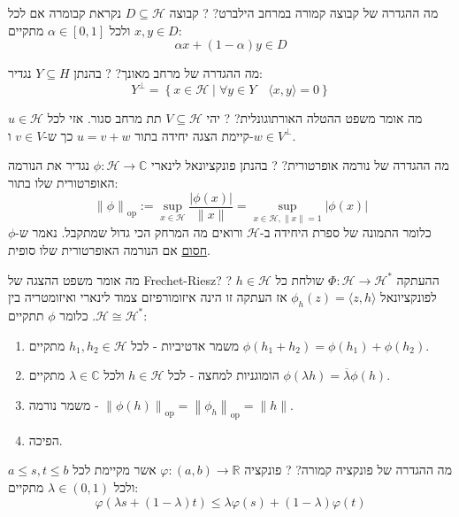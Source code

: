 \documentclass{tstextbook}
\begin{document}
מה ההגדרה של קבוצה קמורה במרחב הילברט?
?
קבוצה \(D \subseteq \mathcal{H}\) נקראת קבומרה אם לכל \(x,y \in D\) ולכל \(\alpha \in[0,1]\) מתקיים:
$$\alpha x+\left( 1-\alpha \right)y \in D$$

מה ההגדרה של מרחב מאונך?
?
בהנתן \(Y\subseteq H\) נגדיר:
$$Y^{\perp}= \left\{  x \in \mathcal{H} \mid \forall y \in Y\quad \langle x,y \rangle =0 \right\}$$

מה אומר משפט ההטלה האורתוגונלית?
?
יהי \(V\subseteq \mathcal{H}\) תת מרחב סגור. אזי לכל \(u\in \mathcal{H}\) קיימת הצגה יחידה בתור \(u=v+w\)  כך ש-\(v \in V\) ו-\(w \in V^{\perp}\).

מה ההגדרה של נורמה אופרטורית?
?
בהנתן פונקציונאל לינארי \(\phi:\mathcal{H}\to \mathbb{C}\) נגדיר את הנורמה האופרטורית שלו בתור:
$$\left\lVert  \phi  \right\rVert _{\mathrm{op}} := \sup _{x \in \mathcal{H}} \frac{\left\lvert  \phi(x)  \right\rvert }{\lVert x \rVert }=\sup _{x \in \mathcal{H}, \lVert x \rVert =1} \left\lvert  \phi(x)  \right\rvert $$
כלומר התמונה של ספרת היחידה ב-\(\mathcal{H}\) ורואים מה המרחק הכי גדול שמתקבל. נאמר ש-\(\phi\)\underline{חסום} אם הנורמה האופרטורית שלו סופית.

מה אומר משפט ההצגה של Frechet-Riesz?
?
ההעתקה \(\Phi:\mathcal{H}\to \mathcal{H}^{*}\) שולחת כל \(h \in \mathcal{H}\) לפונקציונאל \(\phi_{h}(z)=\langle z,h \rangle\) אז העתקה זו הינה איזומורפיזם צמוד לינארי ואיזומטריה בין \(\mathcal{H} \cong \mathcal{H}^{*}\). כלומר \(\phi\) תתקיים:

\begin{enumerate}
  \item משמר אדטיביות - לכל \(h_{1},h_{2} \in \mathcal{H}\) מתקיים \(\phi(h_{1}+h_{2})=\phi(h_{1})+\phi(h_{2})\). 


  \item הומוגניות למחצה - לכל \(h \in \mathcal{H}\) ולכל \(\lambda \in \mathbb{C}\) מתקיים \(\phi\left( \lambda h \right)=\overline{\lambda}\phi(h)\). 


  \item משמר נורמה - \(\left\lVert  \phi(h)  \right\rVert_{\mathrm{op}}=\left\lVert  \phi_{h}  \right\rVert_{\mathrm{op}}=\lVert h \rVert\). 


  \item הפיכה. 


\end{enumerate}
מה ההגדרה של פונקציה קמורה?
?
פונקציה \(\varphi:(a,b)\to \mathbb{R}\) אשר מקיימת לכל \(a\leq s,t \leq b\) ולכל \(\lambda \in (0,1)\) מתקיים:
$$\varphi\left( \lambda s+\left( 1-\lambda \right)t \right)\leq \lambda \varphi(s)+\left( 1-\lambda \right)\varphi(t)$$
\end{document}

